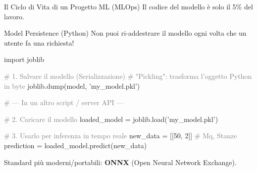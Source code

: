 \documentclass[aspectratio=169, 10pt]{beamer}
\begin{document}
\begin{frame}{Il Ciclo di Vita di un Progetto ML (MLOps)}
    Il codice del modello è solo il 5\% del lavoro.
    
    \centering
\end{frame}

\begin{frame}[fragile]{Model Persistence (Python)}
    Non puoi ri-addestrare il modello ogni volta che un utente fa una richiesta!
    
\begin{semiverbatim}
\scriptsize
\textcolor{Secondary}{import} joblib

\textcolor{gray}{# 1. Salvare il modello (Serializzazione)}
\textcolor{gray}{# "Pickling": trasforma l'oggetto Python in byte}
joblib.dump(model, \textcolor{Accent}{'my_model.pkl'})

\textcolor{gray}{# --- In un altro script / server API ---}

\textcolor{gray}{# 2. Caricare il modello}
loaded_model = joblib.load(\textcolor{Accent}{'my_model.pkl'})

\textcolor{gray}{# 3. Usarlo per inferenza in tempo reale}
new_data = [[50, 2]] \textcolor{gray}{# Mq, Stanze}
prediction = loaded_model.predict(new_data)
\end{semiverbatim}

    \small Standard più moderni/portabili: \textbf{ONNX} (Open Neural Network Exchange).
\end{frame}
\end{document}
